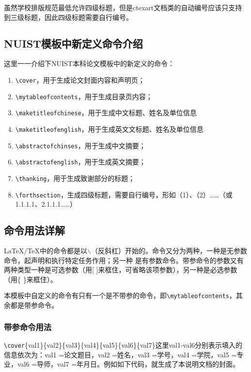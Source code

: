 虽然学校排版规范最低允许四级标题，但是ctexart文档类的自动编号应该只支持到三级标题，因此四级标题需要自行编号。

\subsection{NUIST模板中新定义命令介绍}

这里一一介绍下NUIST本科论文模板中的新定义的命令：

{
\color{blue}
\begin{enumerate}
    \item \verb|\cover|，用于生成论文封面内容和声明页；
    \item \verb|\mytableofcontents|，用于生成目录页内容；
    \item \verb|\maketitleofchinese|，用于生成中文标题、姓名及单位信息
    \item \verb|\maketitleofenglish|，用于生成英文文标题、姓名及单位信息
    \item \verb|\abstractofchinses|，用于生成中文摘要；
    \item \verb|\abstractofenglish|，用于生成英文摘要；
    \item \verb|\thanking|，用于生成致谢部分的标题；
    \item \verb|\forthsection|，生成四级标题，需要自行编号，形如（1）、（2）……（或1.1.1.1、2.1.1.1……）
\end{enumerate}
}


\subsection{命令用法详解}

\LaTeX/\TeX 中的命令都是以$\backslash$（反斜杠）开始的。命令又分为两种，一种是无参数命令，起声明和执行特定任务作用；另一种 是有参数命令。带参命令的参数又有两种类型一种是可选参数（用[ ]来框住，可省略该项参数），另一种是必选参数（用\{ \}来框住）。

本模板中自定义的命令有只有一个是不带参的命令，即\verb|\mytableofcontents|，其余都是带参命令。

\subsubsection{带参命令用法}

\verb|\cover|\{val1\}\{val2\}\{val3\}\{val4\}\{val5\}\{val6\}\{val7\}这里val1-val6分别表示填入的信息依次为：val1 =论文题目，val2 =姓名，val3 =学号，val4 =学院，val5 =专业，val6 =导师，val7 =年月日。例如如下代码，就生成了本说明文档的封面。

